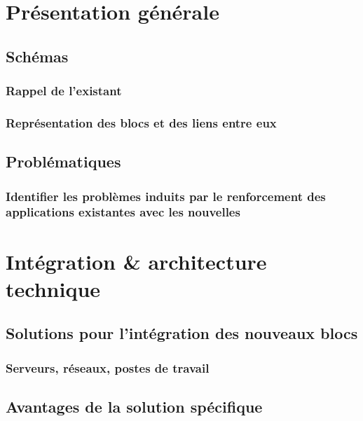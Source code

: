 \section{Présentation générale}

\subsection{Schémas}

\subsubsection{Rappel de l’existant}


\subsubsection{Représentation des blocs et des liens entre eux}


\subsection{Problématiques}

\subsubsection{Identifier les problèmes induits par le renforcement des applications existantes avec les nouvelles}


\section{Intégration \& architecture technique}

\subsection{Solutions pour l’intégration des nouveaux blocs}

\subsubsection{Serveurs, réseaux, postes de travail}


\subsection{Avantages de la solution spécifique}

